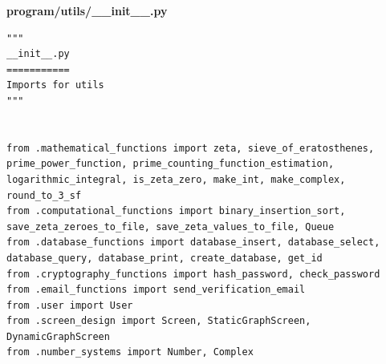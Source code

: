 \documentclass[12pt]{article}
\begin{document}
\textbf{program/utils/\_\_init\_\_.py}
\begin{lstlisting}
"""
__init__.py
===========
Imports for utils
"""


from .mathematical_functions import zeta, sieve_of_eratosthenes, prime_power_function, prime_counting_function_estimation, logarithmic_integral, is_zeta_zero, make_int, make_complex, round_to_3_sf
from .computational_functions import binary_insertion_sort, save_zeta_zeroes_to_file, save_zeta_values_to_file, Queue
from .database_functions import database_insert, database_select, database_query, database_print, create_database, get_id
from .cryptography_functions import hash_password, check_password
from .email_functions import send_verification_email
from .user import User
from .screen_design import Screen, StaticGraphScreen, DynamicGraphScreen
from .number_systems import Number, Complex
\end{lstlisting}
\end{document}
